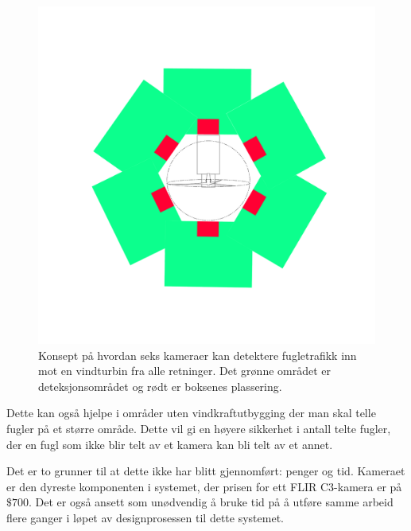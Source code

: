 \begin{figure}[!htbp]
\begin{minipage}[b]{0.45\textwidth}
    \includegraphics[width=\textwidth]{konklusjon/Nettverk.png}
    \caption{Konsept på hvordan seks kameraer kan detektere fugletrafikk inn mot en vindturbin fra alle retninger. Det grønne området er deteksjonsområdet og rødt er boksenes plassering.}
    \label{fig:fraoven}
  \end{minipage}
\end{figure}


Dette kan også hjelpe i områder uten vindkraftutbygging der man skal telle fugler på et større område. 
Dette vil gi en høyere sikkerhet i antall telte fugler, der en fugl som ikke blir telt av et kamera kan bli telt av et annet. 

Det er to grunner til at dette ikke har blitt gjennomført: penger og tid. 
Kameraet er den dyreste komponenten i systemet, der prisen for ett FLIR C3-kamera er på $\$700$. 
Det er også ansett som unødvendig å bruke tid på å utføre samme arbeid flere ganger i løpet av designprosessen til dette systemet.

